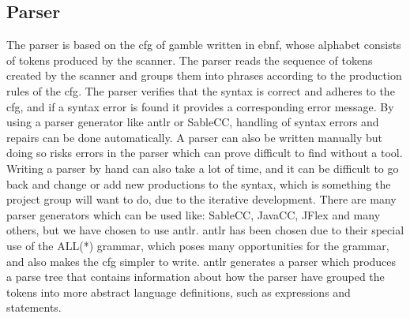 \subsection*{Parser}\label{subsec:parser}
The parser is based on the \acrfull{cfg} of \gls{gamble} written in \acrfull{ebnf}, whose alphabet consists of tokens produced by the scanner.
The parser reads the sequence of tokens created by the scanner and groups them into phrases according to the production rules of the \acrshort{cfg}.
The parser verifies that the syntax is correct and adheres to the \acrshort{cfg}, and if a syntax error is found it provides a corresponding error message. \citep{Crafting_book}
By using a parser generator like \acrshort{antlr} or SableCC, handling of syntax errors and repairs can be done automatically.
A parser can also be written manually but doing so risks errors in the parser which can prove difficult to find without a tool.
Writing a parser by hand can also take a lot of time, and it can be difficult to go back and change or add new productions to the syntax, which is something the project group will want to do, due to the iterative development.
There are many parser generators which can be used like: SableCC, JavaCC, JFlex and many others, but we have chosen to use \acrshort{antlr}.
\acrshort{antlr} has been chosen due to their special use of the ALL(*) grammar, which poses many opportunities for the grammar, and also makes the \acrshort{cfg} simpler to write.
\acrshort{antlr} generates a parser which produces a parse tree that contains information about how the parser have grouped the tokens into more abstract language definitions, such as expressions and statements. 

